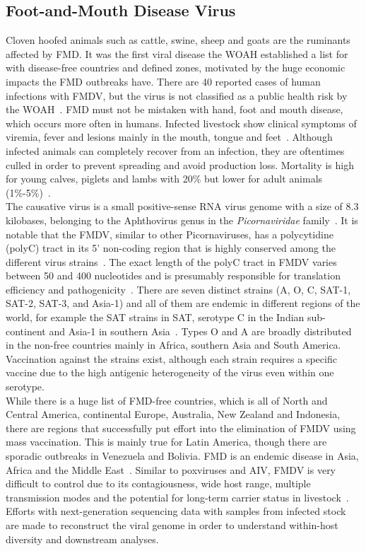 \subsection{Foot-and-Mouth Disease Virus}
Cloven hoofed animals such as cattle, swine, sheep and goats are the ruminants affected by \ac{FMD}. It was the first viral disease the \ac{WOAH} established a list for with disease-free countries and defined zones, motivated by the huge economic impacts the \ac{FMD} outbreaks have. There are 40 reported cases of human infections with \ac{FMDV}, but the virus is not classified as a public health risk by the \ac{WOAH}~\cite{woah2023fmd}. \ac{FMD} must not be mistaken with hand, foot and mouth disease, which occurs more often in humans. Infected livestock show clinical symptoms of viremia, fever and lesions mainly in the mouth, tongue and feet~\cite{domingo1990genetic}. Although infected animals can completely recover from an infection, they are oftentimes culled in order to prevent spreading and avoid production loss. Mortality is high for young calves, piglets and lambs with 20\% but lower for adult animals (1\%-5\%)~\cite{woah2023fmd}. \\
The causative virus is a small positive-sense \ac{RNA} virus genome with a size of 8.3 kilobases, belonging to the Aphthovirus genus in the \textit{Picornaviridae} family~\cite{tax2021virus}. It is notable that the \ac{FMDV}, similar to other Picornaviruses, has a polycytidine (polyC) tract in its 5' non-coding region that is highly conserved among the different virus strains~\cite{penza2021long}. The exact length of the polyC tract in \ac{FMDV} varies between 50 and 400 nucleotides and is presumably responsible for translation efficiency and pathogenicity~\cite{penza2021long}. There are seven distinct strains (A, O, C, SAT-1, SAT-2, SAT-3, and Asia-1) and all of them are endemic in different regions of the world, for example the SAT strains in \ac{SAT}, serotype C in the Indian sub-continent and Asia-1 in southern Asia~\cite{knowles2003molecular}. Types O and A are broadly distributed in the non-free countries mainly in Africa, southern Asia and South America. Vaccination against the strains exist, although each strain requires a specific vaccine due to the high antigenic heterogeneity of the virus even within one serotype. \\
While there is a huge list of \ac{FMD}-free countries, which is all of North and Central America, continental Europe, Australia, New Zealand and Indonesia, there are regions that successfully put effort into the elimination of \ac{FMDV} using mass vaccination. This is mainly true for Latin America, though there are sporadic outbreaks in Venezuela and Bolivia. \ac{FMD} is an endemic disease in Asia, Africa and the Middle East~\cite{brito2017review}. Similar to poxviruses and \ac{AIV}, \ac{FMDV} is very difficult to control due to its contagiousness, wide host range, multiple transmission modes and the potential for long-term carrier status in livestock~\cite{firestone2019reconstructing}. \\
Efforts with next-generation sequencing data with samples from infected stock are made to reconstruct the viral genome in order to understand within-host diversity and downstream analyses.

